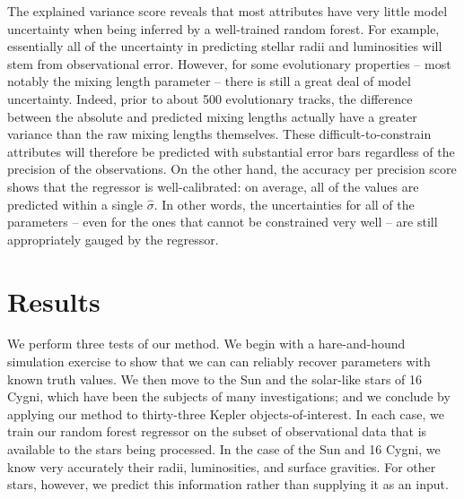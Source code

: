 \documentclass[manuscript]{aastex}
\begin{document}
The explained variance score reveals that most attributes have very little model uncertainty when being inferred by a well-trained random forest. For example, essentially all of the uncertainty in predicting stellar radii and luminosities will stem from observational error. However, for some evolutionary properties -- most notably the mixing length parameter -- there is still a great deal of model uncertainty. Indeed, prior to about 500 evolutionary tracks, the difference between the absolute and predicted mixing lengths actually have a greater variance than the raw mixing lengths themselves. These difficult-to-constrain attributes will therefore be predicted with substantial error bars regardless of the precision of the observations. On the other hand, the accuracy per precision score shows that the regressor is well-calibrated: on average, all of the values are predicted within a single $\hat\sigma$. In other words, the uncertainties for all of the parameters -- even for the ones that cannot be constrained very well -- are still appropriately gauged by the regressor. 

\section{Results}
We perform three tests of our method. We begin with a hare-and-hound simulation exercise to show that we can can reliably recover parameters with known truth values. We then move to the Sun and the solar-like stars of 16 Cygni, which have been the subjects of many investigations; and we conclude by applying our method to thirty-three Kepler objects-of-interest. In each case, we train our random forest regressor on the subset of observational data that is available to the stars being processed. In the case of the Sun and 16 Cygni, we know very accurately their radii, luminosities, and surface gravities. For other stars, however, we predict this information rather than supplying it as an input. 


\end{document}
